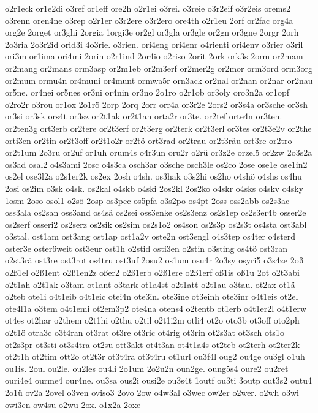 {o2r1eck
or1e2di
o3ref
or1eff
ore2h
o2r1ei
o3rei.
o3reie
o3r2eif
o3r2eis
orems2
o3renn
oren4ne
o3rep
o2r1er
o3r2ere
o3r2ero
ore4th
o2r1eu
2orf
or2fac
org4a
org2e
2orget
or3ghi
2orgia
1orgi3e
or2gl
or3gla
or3gle
or2gn
or3gne
2orgr
2orh
2o3ria
2o3r2id
orid3i
4o3rie.
o3rien.
ori4eng
ori4enr
o4rienti
ori4env
o3rier
o3ril
ori3m
or1ima
ori4mi
2orin
o2r1ind
2or4io
o2riso
2orit
2ork
ork3s
2orm
or2mam
or2mang
or2mans
orm3asp
or2m1eb
or2m3erf
or2mer2g
or2mor
orm3ord
orm3org
or2mum
ormu4n
or4muni
or4munt
ormwa5r
orn3ack
or2nal
or2nan
or2nar
or2nau
or5ne.
or4nei
or5nes
or3ni
or4nin
or3no
2o1ro
o2r1ob
or3oly
oro3n2a
or1opf
o2ro2r
o3rou
or1ox
2o1rö
2orp
2orq
2orr
orr4a
or3r2e
2ors2
or3s4a
or3sche
or3sh
or3si
or3sk
ors4t
or3sz
or2t1ak
or2t1an
orta2r
or3te.
or2tef
orte4n
or3ten.
or2ten3g
ort3erb
or2tere
or2t3erf
or2t3erg
or2terk
or2t3erl
or3tes
or2t3e2v
or2the
orti3en
or2tin
or2t3off
or2t1o2r
or2tö
ort3rad
or2trau
or2t3räu
ort3re
or2tro
or2t1um
2o3ru
or2uf
or1uh
orum4s
o4r3un
oru2r
o2rü
or3z2e
orzel5
or2zw
2o3s2a
os3ad
osal2
o4s3ami
2osc
o4s3ca
osch3ar
o3sche
osch3le
os2co
2ose
ose1e
ose1in2
os2el
ose3l2a
o2s1er2k
os2ex
2osh
o4sh.
os3hak
o3s2hi
os2ho
o4shö
o4shs
os4hu
2osi
os2im
o3sk
o4sk.
os2kal
o4skb
o4ski
2os2kl
2os2ko
o4skr
o4sks
o4skv
o4sky
1osm
2oso
osol1
o2sö
2osp
os3pec
os5pfa
o3s2po
os4pt
2oss
oss2abb
os2s3ac
oss3ala
os2san
oss3and
os4sä
os2sei
oss3enke
os2s3enz
os2s1ep
os2s3er4b
osser2e
os2serf
osseri2
os2serz
os2sik
os2sim
os2s1o2
os4son
os2s3p
os2s3t
os4sta
ost3abl
o3stal.
ost1am
ost3ang
ost1ap
ost1a2v
oste2n
ost3engl
o4s3tep
os4ter
o4sterd
oster3e
oster6weit
ost3eur
ost1h
o2stid
osti3en
o2stin
o3sting
os4tö
ost3ran
o2st3rä
ost3re
ost3rot
os4tru
ost3uf
2osu2
os1um
osu4r
2o3sy
osyri5
o3s4ze
2oß
o2ß1el
o2ß1ent
o2ß1en2z
oßer2
o2ß1erb
o2ß1ere
o2ß1erf
oß1is
oß1u
2ot
o2t3abi
o2t1ah
o2t1ak
o3tam
ot1ant
o3tark
ot1a4st
o2t1att
o2t1au
o3tau.
ot2ax
ot1ä
o2teb
ote1i
o4t1eib
o4t1eic
otei4n
ote3in.
ote3ine
ot3einh
ote3inr
o4t1eis
ot2el
ote4l1a
o3tem
o4t1emi
ot2em3p2
ote4na
otens4
o2tentb
ot1erb
o4t1er2l
o4t1erw
ot4es
ot2har
o2them
o2t1hi
o2thu
o2til
o2t1i2m
otli4
ot2o
oto3b
ot3off
oto2ph
o2t1ö
otra3c
o3t4ran
ot3rat
ot3re
ot3ric
ot4rig
ot3rin
ot2s3at
ot3sch
ots1o
ot2s3pr
ot3sti
ot3s4tra
ot2su
ott3akt
ot4t3an
ot4t1a4s
ot2teb
ot2terh
ot2ter2k
ot2t1h
ot2tim
ott2o
ot2t3r
ot3t4ra
ot3t4ru
ot1url
ou3f4l
oug2
ou4ge
ou3gl
o1uh
ou1is.
2oul
ou2le.
ou2les
ou4li
2o1um
2o2u2n
oun2ge.
oung5s4
oure2
ou2ret
ouri4e4
ourme4
our4ne.
ou3sa
ous2i
ousi2e
ou3s4t
1outf
ou3ti
3outp
out3s2
outu4
2o1ü
ov2a
2ovel
o3ven
oviso3
2ovo
2ow
o4w3al
o3wec
ow2er
o2wer.
o2wh
o3wi
owi3en
ow4su
o2wu
2ox.
o1x2a
2oxe
}
